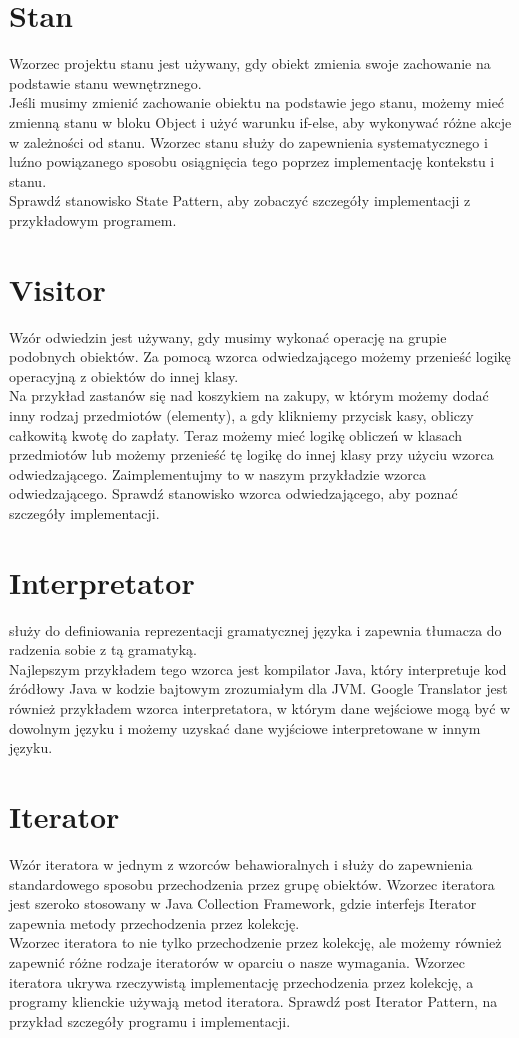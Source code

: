 \documentclass[12pt,a4paper]{article}
\begin{document}
	\section{Stan}
	Wzorzec projektu stanu jest używany, gdy obiekt zmienia swoje zachowanie na podstawie stanu wewnętrznego.\\
	Jeśli musimy zmienić zachowanie obiektu na podstawie jego stanu, możemy mieć zmienną stanu w bloku Object i użyć warunku if-else, aby wykonywać różne akcje w zależności od stanu. Wzorzec stanu służy do zapewnienia systematycznego i luźno powiązanego sposobu osiągnięcia tego poprzez implementację kontekstu i stanu.\\
	Sprawdź stanowisko State Pattern, aby zobaczyć szczegóły implementacji z przykładowym programem\cite{PankajKumar}.
	\section{Visitor}
	Wzór odwiedzin jest używany, gdy musimy wykonać operację na grupie podobnych obiektów. Za pomocą wzorca odwiedzającego możemy przenieść logikę operacyjną z obiektów do innej klasy.\\
	
	Na przykład zastanów się nad koszykiem na zakupy, w którym możemy dodać inny rodzaj przedmiotów (elementy), a gdy klikniemy przycisk kasy, obliczy całkowitą kwotę do zapłaty. Teraz możemy mieć logikę obliczeń w klasach przedmiotów lub możemy przenieść tę logikę do innej klasy przy użyciu wzorca odwiedzającego. Zaimplementujmy to w naszym przykładzie wzorca odwiedzającego. Sprawdź stanowisko wzorca odwiedzającego, aby poznać szczegóły implementacji\cite{PankajKumar}.
	\section{Interpretator}
	służy do definiowania reprezentacji gramatycznej języka i zapewnia tłumacza do radzenia sobie z tą gramatyką.\\
	Najlepszym przykładem tego wzorca jest kompilator Java, który interpretuje kod źródłowy Java w kodzie bajtowym zrozumiałym dla JVM. Google Translator jest również przykładem wzorca interpretatora, w którym dane wejściowe mogą być w dowolnym języku i możemy uzyskać dane wyjściowe interpretowane w innym języku\cite{PankajKumar}.
	\section{Iterator}
	Wzór iteratora w jednym z wzorców behawioralnych i służy do zapewnienia standardowego sposobu przechodzenia przez grupę obiektów. Wzorzec iteratora jest szeroko stosowany w Java Collection Framework, gdzie interfejs Iterator zapewnia metody przechodzenia przez kolekcję.\\
	Wzorzec iteratora to nie tylko przechodzenie przez kolekcję, ale możemy również zapewnić różne rodzaje iteratorów w oparciu o nasze wymagania. Wzorzec iteratora ukrywa rzeczywistą implementację przechodzenia przez kolekcję, a programy klienckie używają metod iteratora. Sprawdź post Iterator Pattern, na przykład szczegóły programu i implementacji\cite{PankajKumar}.
\end{document}
